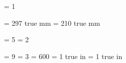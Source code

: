 

\pdfoutput           = 1

\pdfpageheight       = 297 true mm
\pdfpagewidth        = 210 true mm

\pdfminorversion     = 5
\pdfobjcompresslevel = 2

\pdfcompresslevel    = 9
\pdfdecimaldigits    = 3
\pdfpkresolution     = 600
\pdfhorigin          = 1 true in
\pdfvorigin          = 1 true in
